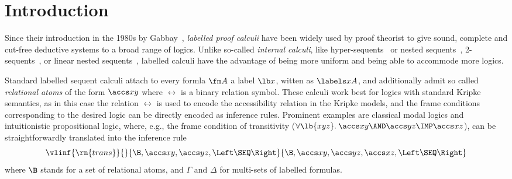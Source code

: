 

\section{Introduction}\label{sec:intro}

Since their introduction in the 1980s by Gabbay~\cite{gabbay:96},
\emph{labelled proof calculi} have been widely used by proof theorist
to give sound, complete and cut-free deductive systems to a broad range
of logics. Unlike so-called \emph{internal calculi}, like
hyper-sequents~\cite{avron:elc96} or nested
sequents~\cite{kashima:sl94,brunnler:aml09,poggiolesi:tmp09}, 2-sequents~\cite{masini:apal92}, or linear nested sequents~\cite{lellmann?},
labelled calculi have the advantage of being more uniform and being able to 
accommode more logics.

Standard labelled sequent calculi attach to every formla $\fm A$ a label
$\lb x$, witten as $\labels xA$, and additionally admit so called
\emph{relational atoms} of the form $\accs xy$ where $\rel$ is a
binary relation symbol. These calculi work best for logics with
standard Kripke semantics, as in this case the relation $\rel$ is used
to encode the accessibility relation in the Kripke models, and the
frame conditions corresponding to the desired logic can be directly
encoded as inference rules. Prominent examples are classical modal
logics and intuitionistic propositional logic, where, e.g., the frame
condition of transitivity ($\forall \lb {xyz}.\:\accs xy\AND \accs yz\IMP\accs xz$), can be straightforwardly translated into the
inference rule
\begin{equation}
  \label{eq:Rtrans}
  \vlinf{\rn{trans}}{}{\B, \accs xy, \accs yz, \Left \SEQ \Right}{
    \B, \accs xy, \accs yz, \accs xz, \Left \SEQ \Right}
\end{equation}
where $\B$ stands for a set of relational atoms, and $\Gamma$ and
$\Delta$ for multi-sets of labelled formulas.

